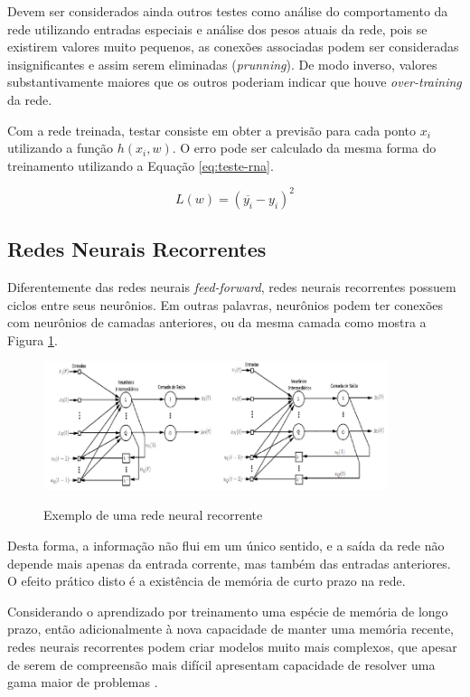 Devem ser considerados ainda outros testes como análise do comportamento da rede utilizando entradas especiais e análise dos pesos atuais da rede, pois se existirem valores muito pequenos, as conexões associadas podem ser consideradas insignificantes e assim serem eliminadas (\textit{prunning}). De modo inverso, valores substantivamente maiores que os outros poderiam indicar que houve \textit{over-training} da rede.

Com a rede treinada, testar consiste em obter a previsão para cada ponto $x_i$ utilizando a função $h(x_i, w)$. O erro pode ser calculado da mesma forma do treinamento utilizando a Equação \ref{eq:teste-rna}.

\begin{equation}
\label{eq:teste-rna}
    L(w) = (\overline{y_i} - y_i)^2
\end{equation}

\subsection{Redes Neurais Recorrentes}

Diferentemente das redes neurais \textit{feed-forward}, redes neurais recorrentes possuem ciclos entre seus neurônios. Em outras palavras, neurônios podem ter conexões com neurônios de camadas anteriores, ou da mesma camada como mostra a Figura \ref{fig:recorrente}.

\begin{figure}[h]
    \caption{Exemplo de uma rede neural recorrente}
    \centering
    \includegraphics[width=0.9\textwidth]{Textuais/Figuras/recorrente.png}
    \label{fig:recorrente}
\end{figure}

Desta forma, a informação não flui em um único sentido, e a saída da rede não depende mais apenas da entrada corrente, mas também das entradas anteriores. O efeito prático disto é a existência de memória de curto prazo na rede.

Considerando o aprendizado por treinamento uma espécie de memória de longo prazo, então adicionalmente à nova capacidade de manter uma memória recente, redes neurais recorrentes podem criar modelos muito mais complexos, que apesar de serem de compreensão mais difícil apresentam capacidade de resolver uma gama maior de problemas \cite{rede-recorrente}.

